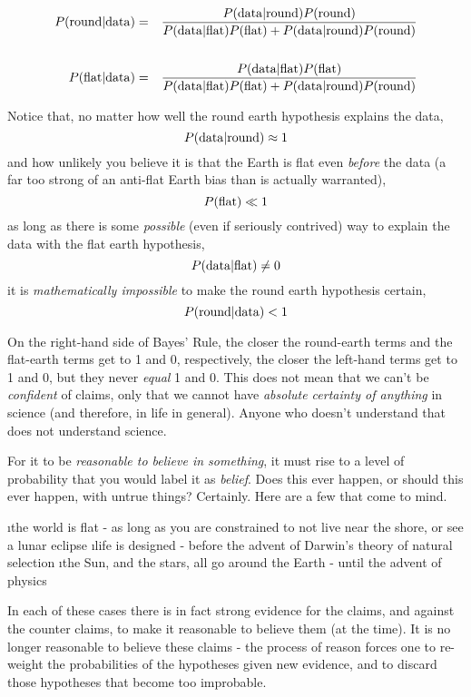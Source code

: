 \begin{eqnarray*}
P({\rm round}|{\rm data}) &=& \frac{P({\rm data}|{\rm round})P({\rm round})}{P({\rm data}|{\rm flat})P({\rm flat})+P({\rm data}|{\rm round})P({\rm round})}\\\\
P({\rm flat}|{\rm data}) &=& \frac{P({\rm data}|{\rm flat})P({\rm flat})}{P({\rm data}|{\rm flat})P({\rm flat})+P({\rm data}|{\rm round})P({\rm round})} 
\end{eqnarray*}

Notice that, no matter how well the round earth hypothesis explains the
data, \[P({\rm data}|{\rm round})\approx 1\] and how unlikely you
believe it is that the Earth is flat even \emph{before} the data (a far
too strong of an anti-flat Earth bias than is actually warranted),
\[P({\rm flat})\ll 1\] as long as there is some \emph{possible} (even if
seriously contrived) way to explain the data with the flat earth
hypothesis, \[P({\rm data}|{\rm flat}) \neq 0\] it is
\emph{mathematically impossible} to make the round earth hypothesis
certain, \[P({\rm round}|{\rm data})< 1\]

On the right-hand side of Bayes' Rule, the closer the round-earth terms
and the flat-earth terms get to 1 and 0, respectively, the closer the
left-hand terms get to 1 and 0, but they never \emph{equal} 1 and 0.
This does not mean that we can't be \emph{confident} of claims, only
that we cannot have \emph{absolute certainty of anything} in science
(and therefore, in life in general). Anyone who doesn't understand that
does not understand science.

For it to be {\em reasonable to believe in something}, it must rise to a level of probability that you would label it as {\em belief}.  Does this ever happen, or should this ever happen, with untrue things?  Certainly.  Here are a few that come to mind.

\be
\i the world is flat - as long as you are constrained to not live near the shore, or see a lunar eclipse
\i life is designed - before the advent of Darwin's theory of natural selection
\i the Sun, and the stars, all go around the Earth - until the advent of physics
\ee

In each of these cases there is in fact strong evidence for the claims, and against the counter claims, to make it reasonable to believe them (at the time).  It is no longer reasonable to believe these claims - the process of reason forces one to re-weight the probabilities of the hypotheses given new evidence, and to discard those hypotheses that become too improbable.

